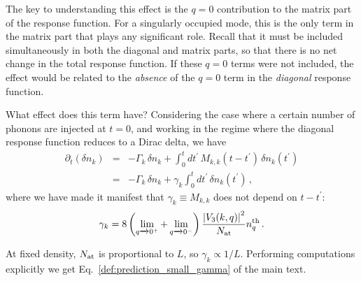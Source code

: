 \documentclass[aps,prd,notitlepage,amsfonts,amssymb,amsmath,nofootinbib,superscriptaddress,longbibliography]{revtex4-2}
\begin{document}
\begin{appendices}
The key to understanding this effect is the $q=0$ contribution to the matrix part of the response function.  For a singularly occupied mode, this is the only term in the matrix part that plays any significant role.  Recall that it must be included simultaneously in both the diagonal and matrix parts, so that there is no net change in the total response function.  If these $q=0$ terms were not included, the effect would be related to the {\it absence} of the $q=0$ term in the {\it diagonal} response function.

What effect does this term have?  Considering the case where a certain number of phonons are injected at $t=0$, and working in the regime where the diagonal response function reduces to a Dirac delta, we have
\begin{eqnarray}
    \partial_{t}\left(\delta n_{k}\right) &=& -\Gamma_{k} \, \delta n_{k} + \int_{0}^{t} dt^{\prime} \, M_{k,k}\left(t-t^{\prime}\right) \, \delta n_{k}\left(t^{\prime}\right) \nonumber \\
    & = & -\Gamma_{k} \, \delta n_{k} + \gamma_{k} \int_{0}^{t} dt^{\prime} \, \delta n_{k}\left(t^{\prime}\right) \,,
    \label{eq:finite_size_deceleration}
\end{eqnarray}
where we have made it manifest that $\gamma_{k} \equiv M_{k,k}$ does not depend on $t-t^{\prime}$:
\begin{equation}
\gamma_k = 8 \left( \lim_{q \xrightarrow{} 0^{+}} + \lim_{q \xrightarrow{} 0^{-}} \right) \frac{\left| V_{3}(k,q) \right|^{2}}{ N_{\rm at}}   n^{\rm th}_q  \, .
    \label{eq:total_correction_decay_rate}
\end{equation}

At fixed density, $N_{\rm at}$ is proportional to $L$, so $\gamma_{k} \propto 1/L$.
Performing computations explicitly we get
Eq.~\eqref{def:prediction_small_gamma} of the main text.


\end{appendices}
\end{document}

